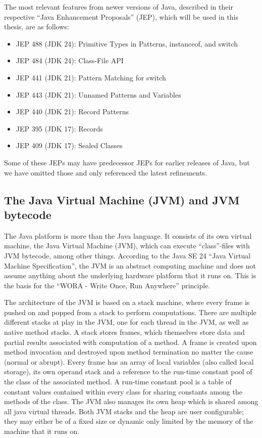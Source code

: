 The most relevant features from newer versions of Java, described in their respective ``Java Enhancement Proposals'' (JEP), which will be used in this thesis, are as follows:

\begin{itemize}
    \item JEP 488 (JDK 24): Primitive Types in Patterns, instanceof, and switch
    \item JEP 484 (JDK 24): Class-File API
    \item JEP 441 (JDK 21): Pattern Matching for switch
    \item JEP 443 (JDK 21): Unnamed Patterns and Variables
    \item JEP 440 (JDK 21): Record Patterns
    \item JEP 395 (JDK 17): Records
    \item JEP 409 (JDK 17): Sealed Classes
\end{itemize}

Some of these JEPs may have predecessor JEPs for earlier releases of Java, but we have omitted those and only referenced the latest refinements. 

\subsection{The Java Virtual Machine (JVM) and JVM bytecode}

The Java platform is more than the Java language. It consists of its own virtual machine,
the Java Virtual Machine (JVM), which can execute ``class''-files with JVM bytecode, among other things.
According to the Java SE 24 ``Java Virtual Machine Specification'', the JVM is an abstract computing machine
and does not assume anything about the underlying hardware platform that it runs on. This is the basis for the
``WORA - Write Once, Run Anywhere'' principle.

The architecture of the JVM is based on a stack machine, where every frame is pushed on and popped from
a stack to perform computations. There are multiple different stacks at play in the JVM, one for each
thread in the JVM, as well as native method stacks. A stack stores frames, which themselves store data
and partial results associated with computation of a method. A frame is created upon method invocation
and destroyed upon method termination no matter the cause (normal or abrupt). Every frame has an array
of local variables (also called local storage), its own operand stack and a reference to the run-time
constant pool of the class of the associated method. A run-time constant pool is a table of constant
values contained within every class for sharing constants among the methods of the class. The JVM
also manages its own heap which is shared among all java virtual threads. Both JVM stacks and the heap
are user configurable; they may either be of a fixed size or dynamic only limited by the memory of
the machine that it runs on.

